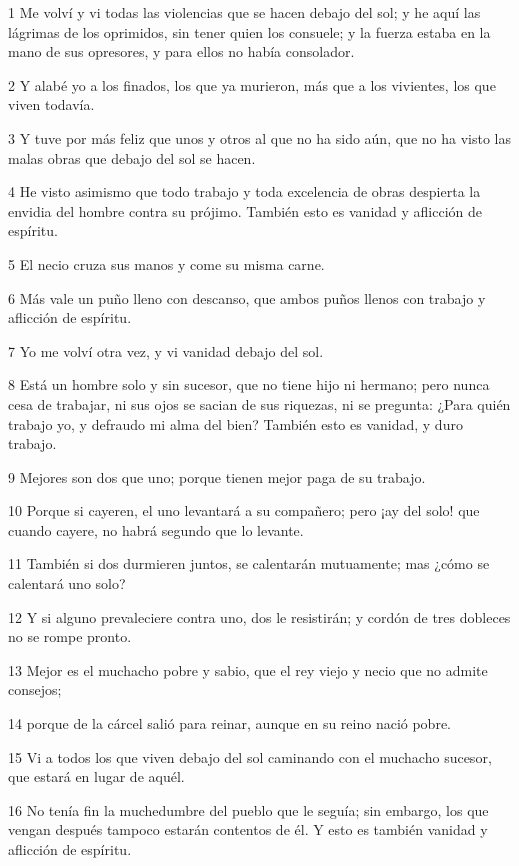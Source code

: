\par 1 Me volví y vi todas las violencias que se hacen debajo del sol; y he aquí las lágrimas de los oprimidos, sin tener quien los consuele; y la fuerza estaba en la mano de sus opresores, y para ellos no había consolador.
\par 2 Y alabé yo a los finados, los que ya murieron, más que a los vivientes, los que viven todavía.
\par 3 Y tuve por más feliz que unos y otros al que no ha sido aún, que no ha visto las malas obras que debajo del sol se hacen.
\par 4 He visto asimismo que todo trabajo y toda excelencia de obras despierta la envidia del hombre contra su prójimo. También esto es vanidad y aflicción de espíritu.
\par 5 El necio cruza sus manos y come su misma carne.
\par 6 Más vale un puño lleno con descanso, que ambos puños llenos con trabajo y aflicción de espíritu.
\par 7 Yo me volví otra vez, y vi vanidad debajo del sol.
\par 8 Está un hombre solo y sin sucesor, que no tiene hijo ni hermano; pero nunca cesa de trabajar, ni sus ojos se sacian de sus riquezas, ni se pregunta: ¿Para quién trabajo yo, y defraudo mi alma del bien? También esto es vanidad, y duro trabajo.
\par 9 Mejores son dos que uno; porque tienen mejor paga de su trabajo.
\par 10 Porque si cayeren, el uno levantará a su compañero; pero ¡ay del solo! que cuando cayere, no habrá segundo que lo levante.
\par 11 También si dos durmieren juntos, se calentarán mutuamente; mas ¿cómo se calentará uno solo?
\par 12 Y si alguno prevaleciere contra uno, dos le resistirán; y cordón de tres dobleces no se rompe pronto.
\par 13 Mejor es el muchacho pobre y sabio, que el rey viejo y necio que no admite consejos;
\par 14 porque de la cárcel salió para reinar, aunque en su reino nació pobre.
\par 15 Vi a todos los que viven debajo del sol caminando con el muchacho sucesor, que estará en lugar de aquél.
\par 16 No tenía fin la muchedumbre del pueblo que le seguía; sin embargo, los que vengan después tampoco estarán contentos de él. Y esto es también vanidad y aflicción de espíritu.

